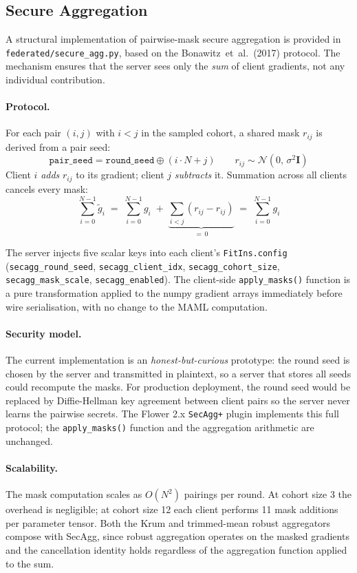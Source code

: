 \documentclass[12pt]{article}
\theoremstyle{plain}
\begin{document}
\subsection{Secure Aggregation}
\label{sec:secagg}

A structural implementation of pairwise-mask secure aggregation is provided in
\texttt{federated/secure\_agg.py}, based on the Bonawitz~et~al.\ (2017) protocol.
The mechanism ensures that the server sees only the \emph{sum} of client gradients,
not any individual contribution.

\paragraph{Protocol.}
For each pair $(i,j)$ with $i < j$ in the sampled cohort, a shared mask $r_{ij}$ is
derived from a pair seed:
\[
  \texttt{pair\_seed} = \texttt{round\_seed} \oplus (i \cdot N + j)
  \qquad r_{ij} \sim \mathcal{N}(0,\,\sigma^2\mathbf{I})
\]
Client $i$ \emph{adds} $r_{ij}$ to its gradient; client $j$ \emph{subtracts} it.
Summation across all clients cancels every mask:
\[
  \sum_{i=0}^{N-1} \tilde{g}_i
  \;=\; \sum_{i=0}^{N-1} g_i
  \;+\; \underbrace{\sum_{i<j}(r_{ij} - r_{ij})}_{=\,0}
  \;=\; \sum_{i=0}^{N-1} g_i
\]

The server injects five scalar keys into each client's \texttt{FitIns.config}
(\texttt{secagg\_round\_seed}, \texttt{secagg\_client\_idx},
\texttt{secagg\_cohort\_size}, \texttt{secagg\_mask\_scale}, \texttt{secagg\_enabled}).
The client-side \texttt{apply\_masks()} function is a pure transformation applied
to the numpy gradient arrays immediately before wire serialisation, with no change
to the MAML computation.

\paragraph{Security model.}
The current implementation is an \emph{honest-but-curious} prototype: the round
seed is chosen by the server and transmitted in plaintext, so a server that stores
all seeds could recompute the masks.
For production deployment, the round seed would be replaced by Diffie-Hellman key
agreement between client pairs so the server never learns the pairwise secrets.
The Flower 2.x \texttt{SecAgg+} plugin implements this full protocol; the
\texttt{apply\_masks()} function and the aggregation arithmetic are unchanged.

\paragraph{Scalability.}
The mask computation scales as $O(N^2)$ pairings per round.
At cohort size 3 the overhead is negligible; at cohort size 12 each client performs
11 mask additions per parameter tensor.
Both the Krum and trimmed-mean robust aggregators compose with SecAgg, since robust
aggregation operates on the masked gradients and the cancellation identity holds
regardless of the aggregation function applied to the sum.
\end{document}
